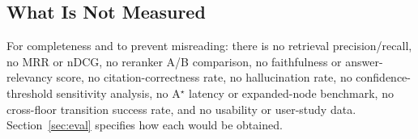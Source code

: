 \subsection{What Is Not Measured}
For completeness and to prevent misreading: there is no retrieval
precision/recall, no MRR or nDCG, no reranker A/B comparison, no
faithfulness or answer-relevancy score, no citation-correctness rate, no
hallucination rate, no confidence-threshold sensitivity analysis, no
A$^{\star}$ latency or expanded-node benchmark, no cross-floor transition
success rate, and no usability or user-study data. Section~\ref{sec:eval}
specifies how each would be obtained.
